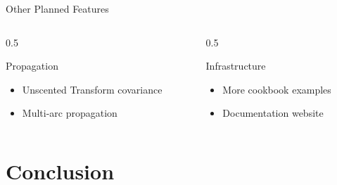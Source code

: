 \documentclass[aspectratio=169,12pt]{beamer}
\begin{document}
\begin{frame}{Other Planned Features}
    \begin{columns}
        \begin{column}{0.5\textwidth}
            \begin{block}{Propagation}
                \begin{itemize}
                    \item Unscented Transform covariance
                    \item Multi-arc propagation
                \end{itemize}
            \end{block}
        \end{column}
        \begin{column}{0.5\textwidth}
            \begin{alertblock}{Infrastructure}
                \begin{itemize}
                    \item More cookbook examples
                    \item Documentation website
                \end{itemize}
            \end{alertblock}
        \end{column}
    \end{columns}
\end{frame}

\section{Conclusion}
\end{document}

